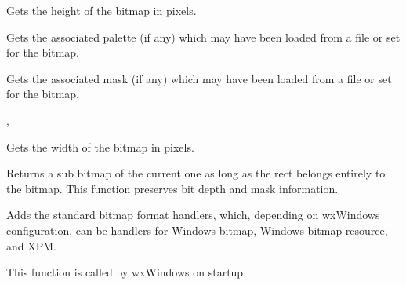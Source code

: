 

\label{wxbitmapgetheight}


Gets the height of the bitmap in pixels.

\label{wxbitmapgetpalette}


Gets the associated palette (if any) which may have been loaded from a file
or set for the bitmap.



\label{wxbitmapgetmask}


Gets the associated mask (if any) which may have been loaded from a file
or set for the bitmap.


, 

\label{wxbitmapgetwidth}


Gets the width of the bitmap in pixels.



\label{wxbitmapgetsubbitmap}


Returns a sub bitmap of the current one as long as the rect belongs entirely to 
the bitmap. This function preserves bit depth and mask information.



Adds the standard bitmap format handlers, which, depending on wxWindows
configuration, can be handlers for Windows bitmap, Windows bitmap resource, and XPM.

This function is called by wxWindows on startup.

